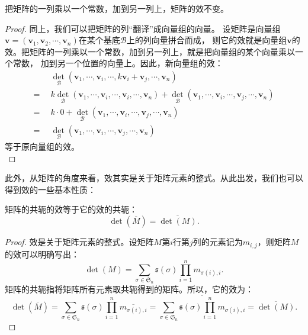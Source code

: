 \documentclass[12pt,UTF8]{ctexbook}
\begin{document}
\begin{pp}\label{pp:10_38}
    把矩阵的一列乘以一个常数，加到另一列上，矩阵的效不变。
\end{pp}
\begin{proof} %
    同上，我们可以把矩阵的列“翻译”成向量组的向量。
    设矩阵是向量组$\mathbf{v} = (\mathbf{v}_1, \mathbf{v}_2, \cdots , \mathbf{v}_n)$在某个基底$\mathcal{B}$上的列向量拼合而成，
    则它的效就是向量组$\mathbf{v}$的效。把矩阵的一列乘以一个常数，加到另一列上，就是把向量组的某个向量乘以一个常数，
    加到另一个位置的向量上。因此，新向量组的效：
    \begin{align*}
        & \,\,\,\det_\mathcal{B} (\mathbf{v}_1,  \cdots , \mathbf{v}_i, \cdots , k \mathbf{v}_i + \mathbf{v}_j, \cdots , \mathbf{v}_n)  \\
        =& \,\,\, k\det_\mathcal{B} (\mathbf{v}_1,  \cdots , \mathbf{v}_i, \cdots , \mathbf{v}_i, \cdots , \mathbf{v}_n) + \det_\mathcal{B} (\mathbf{v}_1,  \cdots , \mathbf{v}_i, \cdots , \mathbf{v}_j, \cdots , \mathbf{v}_n)  \\
        =& \,\,\, k\cdot 0 + \det_\mathcal{B} (\mathbf{v}_1,  \cdots , \mathbf{v}_i, \cdots , \mathbf{v}_j, \cdots , \mathbf{v}_n)  \\
        =& \,\,\, \det_\mathcal{B} (\mathbf{v}_1,  \cdots , \mathbf{v}_i, \cdots , \mathbf{v}_j, \cdots , \mathbf{v}_n)  
    \end{align*}
    等于原向量组的效。\\
\end{proof}

此外，从矩阵的角度来看，效其实是关于矩阵元素的整式。从此出发，我们也可以得到效的一些基本性质：
\begin{pp}\label{pp:10_34}
    矩阵的共轭的效等于它的效的共轭：
    $$ \det(\overline{M}) = \overline{\det(M)}.$$
\end{pp}
\begin{proof} %
    效是关于矩阵元素的整式。设矩阵$M$第$i$行第$j$列的元素记为$m_{i,j}$，则矩阵$M$的效可以明确写出：
    $$ \det (M) = \sum_{\sigma\in\mathfrak{S}_n} \mathfrak{s}(\sigma) \prod_{i=1}^n m_{\sigma(i),i}. $$
    矩阵的共轭指将矩阵所有元素取共轭得到的矩阵。所以，它的效为：
    $$ \det(\overline{M}) = \sum_{\sigma\in\mathfrak{S}_n} \mathfrak{s}(\sigma) \prod_{i=1}^n \overline{m_{\sigma(i),i}} = \overline{\sum_{\sigma\in\mathfrak{S}_n} \mathfrak{s}(\sigma) \prod_{i=1}^n m_{\sigma(i),i}} = \overline{\det(M)}. $$
\end{proof}
\end{document}
